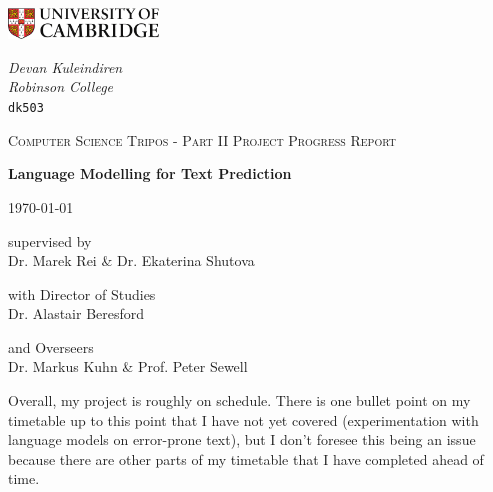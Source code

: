 \documentclass[a4paper, 12pt]{article}
\begin{document}
\begin{titlepage}
	\noindent
	\begin{minipage}[t][][t]{0.5\textwidth}
		\includegraphics[width=40mm]{./Images/CamLogo.jpg}
	\end{minipage}
	\begin{minipage}{0.5\textwidth}
	\begin{flushright}
		\large
		\textit{Devan Kuleindiren}
		\\
		\textit{Robinson College}
		\\
		\texttt{dk503}
	\end{flushright}
	\end{minipage}
	
	\begin{center}
	\vspace{6cm}
	{\scshape\large Computer Science Tripos - Part II Project Progress Report\par}
	\vspace{0.5cm}
	{\huge\bfseries Language Modelling for Text Prediction\par}
	\vspace{0.5cm}
	{\large \today \par}
	\end{center}
	
	\vfill
	
	\begin{center}
	supervised by \\
	Dr. Marek Rei \& Dr. Ekaterina Shutova
	\end{center}
	
	\begin{center}
	with Director of Studies \\
	Dr. Alastair Beresford
	\end{center}
	
	\begin{center}
	and Overseers \\
	Dr. Markus Kuhn \& Prof. Peter Sewell
	\end{center}
	
	\vspace{1.5cm}
\end{titlepage}

Overall, my project is roughly on schedule. There is one bullet point on my timetable up to this point that I have not yet covered (experimentation with language models on error-prone text), but I don't foresee this being an issue because there are other parts of my timetable that I have completed ahead of time.
\end{document}
